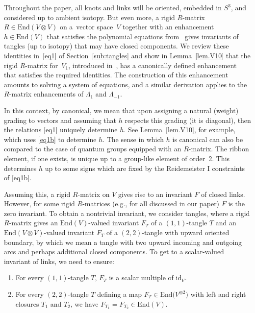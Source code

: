 \documentclass[pdftex]{sigma}
\makeatletter
\numberwithin{equation}{section}
\theoremstyle{definition}
\def\namedlabel#1#2{\begingroup
 #2%
 \def\@currentlabel{#2}%
 \phantomsection\label{#1}\endgroup
}
\makeatother
\begin{document}
Throughout the paper, all knots and links will be oriented, embedded in $S^3$,
and considered up to ambient isotopy.
But even more, a rigid $R$-matrix $R \in \mathrm{End}(V \otimes V)$ on a~vector space~$V$ together with
an enhancement $h \in \mathrm{End}(V)$ that satisfies the polynomial equations
from~\cite[Theorem~3.7]{Ohtsuki} gives invariants of tangles (up to isotopy)
that may have closed components. We review these identities in~\eqref{eq1} of Section~\ref{sub:tangles} and show in Lemma~\ref{lem.V10} that the rigid $R$-matrix for~$V_1$, introduced in~\cite{GK:multi}, has a canonically defined enhancement that satisfies the
required identities. The construction of this enhancement amounts to solving a system of equations, and a similar derivation applies to the $R$-matrix enhancements of $\Lambda_1$ and $\Lambda_{-1}$.

In this context, by canonical, we mean that upon assigning a natural (weight) grading to vectors and assuming that $h$ respects this grading (it is diagonal), then the relations \eqref{eq1} uniquely determine $h$. See Lemma~\ref{lem.V10}, for example, which uses \eqref{eq1b} to determine $h$. The sense in which $h$ is canonical can also be compared to the case of quantum groups equipped with an $R$-matrix. The ribbon element, if one exists, is unique up to a group-like element of order~2. This determines $h$ up to some signs which are fixed by the Reidemeister I constraints of \eqref{eq1b}.

Assuming this, a rigid $R$-matrix on $V$ gives rise to an invariant $F$ of
closed links. However, for some rigid $R$-matrices (e.g., for all discussed
in our paper) $F$ is the zero invariant.
To obtain a nontrivial invariant, we consider tangles,
where a rigid $R$-matrix gives an $\mathrm{End}(V)$-valued invariant $F_T$ of a
$(1,1)$-tangle $T$ and an $\mathrm{End}(V\otimes V)$-valued invariant $F_T$
of a $(2,2)$-tangle with upward oriented boundary, by which we mean a tangle
with two upward incoming and outgoing arcs and perhaps additional closed components.
To get to a scalar-valued invariant of links, we need to ensure:
\begin{enumerate}\itemsep=0pt
\item[(\namedlabel{item:P1}{$P_1$})]
 For every $(1,1)$-tangle $T$, $F_T$ is a scalar multiple of
 $\mathrm{id}_V$.
\item[(\namedlabel{item:P2}{$P_2$})]
 For every $(2,2)$-tangle $T$ defining a map $F_T\in\mathrm{End}\bigl(V^{\otimes 2}\bigr)$
 with left and right closures $T_1$ and $T_2$, we have
 $F_{T_1}=F_{T_2} \in \mathrm{End}(V)$.
\end{enumerate}
\end{document}
